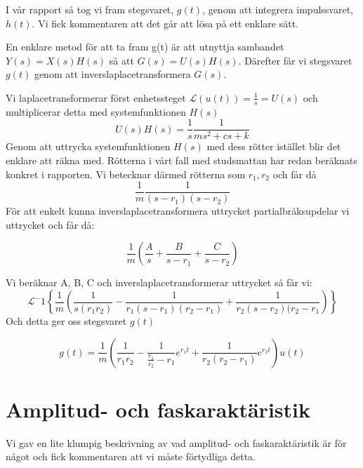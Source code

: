 \documentclass[10pt,a4paper]{article}
\begin{document}
I vår rapport så tog vi fram stegsvaret, $g(t)$, genom att integrera impulssvaret, $h(t)$. Vi fick kommentaren att det går att lösa på ett enklare sätt. 

En enklare metod för att ta fram g(t) är att utnyttja sambandet $Y(s) = X(s)H(s)$ så att $G(s) = U(s)H(s)$. Därefter får vi stegsvaret $g(t)$ genom att inverslaplacetransformera $G(s)$.

Vi laplacetransformerar först enhetssteget $\mathcal{L}(u(t)) = \frac{1}{s} = U(s)$ och multiplicerar detta med systemfunktionen $H(s)$
\begin{equation}
U(s)H(s) = \frac{1}{s} \frac{1}{ms^2 + cs + k}
\end{equation}
Genom att uttrycka systemfunktionen $H(s)$ med dess rötter istället blir det enklare att räkna med. Rötterna i vårt fall med studsmattan har redan beräknats konkret i rapporten. Vi betecknar därmed rötterna som $r_1, r_2$ och får då 
\begin{equation}
\frac{1}{m} \frac{1}{(s - r_1) (s - r_2)}
\end{equation}
För att enkelt kunna inverslaplacetransformera uttrycket partialbråksupdelar vi uttrycket och får då:

\begin{equation}
\frac{1}{m} \left(\frac{A}{s} + \frac{B}{s - r_1} + \frac{C}{s - r_2}\right)
\end{equation}

Vi beräknar A, B, C och inverslaplacetransformerar uttrycket så får vi:
\begin{equation}
\mathcal{L}^-1\left\lbrace \frac{1}{m} \left( \frac{1}{s(r_1 r_2)} - \frac{1}{r_1(s-r_1)(r_2-r_1)} + \frac{1}{r_2(s-r_2)(r_2 - r_1}   \right) \right\rbrace
\end{equation}
Och detta ger oss stegsvaret $g(t)$

\begin{equation}
g(t) = \frac{1}{m} \left( \frac{1}{r_1 r_2} - \frac{1}{\frac{r_1}{r_2} - r_1} e^{r_1t} + \frac{1}{r_2(r_2 - r_1)} e^{r_2 t}   \right) u(t)
\end{equation}


\section{Amplitud- och faskaraktäristik}

Vi gav en lite klumpig beskrivning av vad amplitud- och faskaraktäristik är för något och fick kommentaren att vi måste förtydliga detta.
\end{document}
